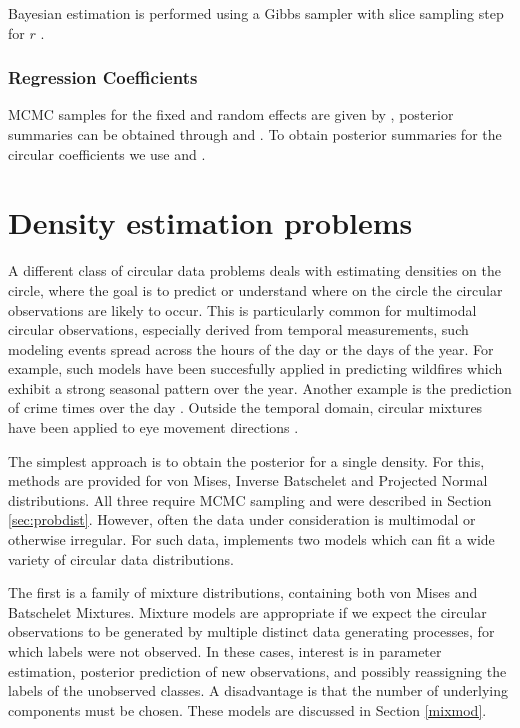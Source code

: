 Bayesian estimation is performed using a Gibbs sampler with slice
sampling step for \(r\) \citep{hernandez2017general}.

\hypertarget{regression-coefficients-1}{%
\subsubsection{Regression
Coefficients}\label{regression-coefficients-1}}

MCMC samples for the fixed and random effects are given by
, posterior summaries can be obtained
through  and . To
obtain posterior summaries for the circular coefficients
\citep{longitudinalpaper} we use  and
.

\hypertarget{density-estimation-problems}{%
\section{Density estimation
problems}\label{density-estimation-problems}}

\label{densest}

A different class of circular data problems deals with estimating
densities on the circle, where the goal is to predict or understand
where on the circle the circular observations are likely to occur. This
is particularly common for multimodal circular observations, especially
derived from temporal measurements, such modeling events spread across
the hours of the day or the days of the year. For example, such models
have been succesfully applied in predicting wildfires
\citep{ameijeiras2018directional, ley2018applied} which exhibit a strong
seasonal pattern over the year. Another example is the prediction of
crime times over the day \citep{ashby2013comparison}. Outside the
temporal domain, circular mixtures have been applied to eye movement
directions \citep{van2016infants}.

The simplest approach is to obtain the posterior for a single density.
For this, methods are provided for von Mises, Inverse Batschelet and
Projected Normal distributions. All three require MCMC sampling and were
described in Section \ref{sec:probdist}. However, often the data under
consideration is multimodal or otherwise irregular. For such data,
 implements two models which can fit a wide variety of
circular data distributions.

The first is a family of mixture distributions, containing both von
Mises and Batschelet Mixtures. Mixture models are appropriate if we
expect the circular observations to be generated by multiple distinct
data generating processes, for which labels were not observed. In these
cases, interest is in parameter estimation, posterior prediction of new
observations, and possibly reassigning the labels of the unobserved
classes. A disadvantage is that the number of underlying components must
be chosen. These models are discussed in Section \ref{mixmod}.

